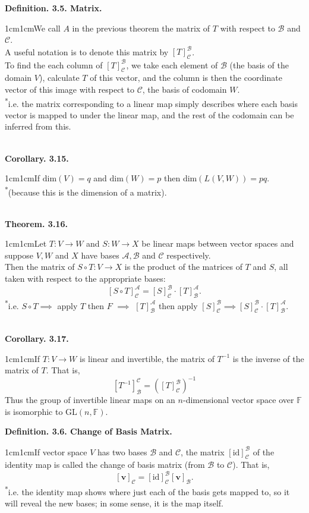 \documentclass{article}
\newcommand{\vect}[1]{\mathbf{#1}}
\newcommand{\definition}[2]{\textbf{Definition. #1.}\begin{adjustwidth}{1cm}{1cm}#2\end{adjustwidth}}
\newcommand{\theorem}[2]{\textbf{Theorem. #1.}\begin{adjustwidth}{1cm}{1cm}#2\end{adjustwidth}}
\newcommand{\corollary}[2]{\textbf{Corollary. #1.}\begin{adjustwidth}{1cm}{1cm}#2\end{adjustwidth}}
\begin{document}
\definition{3.5. Matrix}{We call $A$ in the previous theorem the matrix of $T$ with respect to $\mathcal{B}$ and $\mathcal{C}$.\\A useful notation is to denote this matrix by $[T]^\mathcal{B}_\mathcal{C}$.\\[1\baselineskip]To find the each column of $[T]^\mathcal{B}_\mathcal{C}$, we take each element of $\mathcal{B}$ (the basis of the domain $V$), calculate $T$ of this vector, and the column is then the coordinate vector of this image with respect to $\mathcal{C}$, the basis of codomain $W$.\\[1\baselineskip]\textsuperscript{*}i.e. the matrix corresponding to a linear map simply describes where each basis vector is mapped to under the linear map, and the rest of the codomain can be inferred from this.}~\\
\corollary{3.15}{If $\text{dim}(V) = q$ and $\text{dim}(W) = p$ then $\text{dim}(L(V,W)) = pq$.\\\textsuperscript{*}(because this is the dimension of a matrix).}~\\
\theorem{3.16}{Let $T: V \rightarrow W$ and $S: W \rightarrow X$ be linear maps between vector spaces and suppose $V, W$ and $X$ have bases $\mathcal{A}, \mathcal{B}$ and $\mathcal{C}$ respectively.\\Then the matrix of $S \circ T: V \rightarrow X$ is the product of the matrices of $T$ and $S$, all taken with respect to the appropriate bases: \[ [S \circ T]^\mathcal{A}_\mathcal{C} = [S]^\mathcal{B}_\mathcal{C} \cdot [T]^\mathcal{A}_\mathcal{B}.\]\textsuperscript{*}i.e. $S \circ T \implies $ apply $T$ then $F$ $\implies$ $[T]^\mathcal{A}_\mathcal{B}$ then apply $[S]^\mathcal{B}_\mathcal{C} \implies [S]^\mathcal{B}_\mathcal{C} \cdot [T]^\mathcal{A}_\mathcal{B}.$}~\\
\corollary{3.17}{If $T: V \rightarrow W$ is linear and invertible, the matrix of $T^{-1}$ is the inverse of the matrix of $T$. That is,\[ [T^{-1}]^\mathcal{C}_\mathcal{B} = ([T]^\mathcal{B}_\mathcal{C})^{-1} \]Thus the group of invertible linear maps on an $n$-dimensional vector space over $\mathbb{F}$ is isomorphic to $\text{GL}(n, \mathbb{F})$.}\newpage
\definition{3.6. Change of Basis Matrix}{If vector space $V$ has two bases $\mathcal{B}$ and $\mathcal{C}$, the matrix $[\text{id}]^\mathcal{B}_\mathcal{C}$ of the identity map is called the change of basis matrix (from $\mathcal{B}$ to $\mathcal{C}$). That is, \[[\vect{v}]_\mathcal{C} = [\text{id}]^\mathcal{B}_\mathcal{C}[\vect{v}]_\mathcal{B}.\]\textsuperscript{*}i.e. the identity map shows where just each of the basis gets mapped to, so it will reveal the new bases; in some sense, it is the map itself.}~\\
\end{document}
